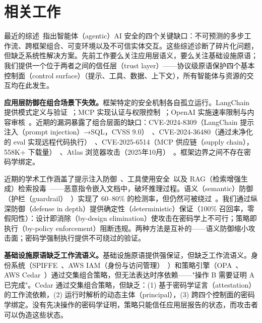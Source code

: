 \section{相关工作}
\label{sec:related-work}

最近的综述~\cite{acm-ai-agents-survey2024,agentic-security-survey2025,gong-prompt-injection2024,liu-protocol-exploits2025}指出智能体（agentic）AI 安全的四个关键缺口：不可预测的多步工作流、跨框架组合、可变环境以及不可信实体交互。这些综述诊断了碎片化问题，但缺乏系统性解决方案。先前工作要么关注应用层语义，要么关注基础设施原语；我们提供一个位于两者之间的信任层（trust layer）——协议级原语保护四个基本控制面（control surface）（提示、工具、数据、上下文），所有智能体与资源的交互均在此发生。

\textbf{应用层防御在组合场景下失效。}框架特定的安全机制各自孤立运行。LangChain 提供模式定义与验证~\cite{langchain2023}；MCP 实现认证与权限控制~\cite{mcp2024}；OpenAI 实施速率限制与内容审核~\cite{openai-assistants2024}。近期的漏洞暴露了组合层面的缺口：CVE-2024-8309（LangChain 提示注入（prompt injection）→SQL，CVSS 9.0）~\cite{cve-2024-8309}、CVE-2024-36480（通过未净化的 eval{} 实现远程代码执行）~\cite{cve-2024-36480}、CVE-2025-6514（MCP 供应链（supply chain），558K+ 下载量）~\cite{github-mcp-cve}、Atlas 浏览器攻击（2025年10月）~\cite{atlas-cve,openai-ciso-atlas}。框架边界之间不存在密码学绑定。

近期的学术工作涵盖了提示注入防御~\cite{perez2022ignore,liu2023prompt,jain2023baseline}、工具使用安全~\cite{ruan2023identifying}以及 RAG（检索增强生成）检索投毒~\cite{zou2024poisonedrag,cheng2024parden}——恶意指令嵌入文档中，破坏推理过程。语义（semantic）防御（护栏（guardrail）~\cite{nemoguardrails2023,rebuff2023,llamaguard2023}）实现了 60--80\% 的检测率，但仍然可被绕过~\cite{wei2023jailbroken,zou2023universal}。我们通过纵深防御（defense in depth）提供确定性（deterministic）保证（100\% 召回率，零假阳性）：设计即消除（by-design elimination）使攻击在密码学上不可行；策略即执行（by-policy enforcement）阻断违规。两种方法是互补的——语义防御缩小攻击面；密码学强制执行提供不可绕过的验证。

\textbf{基础设施原语缺乏工作流语义。}基础设施原语提供强保证，但缺乏工作流语义。身份系统（SPIFFE~\cite{spiffe2023}、AWS IAM（身份与访问管理）~\cite{aws-iam2023}）和策略引擎（OPA~\cite{opa2023}、AWS Cedar~\cite{cedar2023}）通过交集组合策略，但无法表达时序依赖——"操作 B 需要证明 A 已完成"。Cedar 通过交集组合策略，但缺乏：(1) 基于密码学证言（attestation）的工作流依赖，(2) 运行时解析的动态主体（principal），(3) 跨四个控制面的密码学绑定。没有先决操作的密码学证明，策略只能信任应用层报告的状态，而攻击者可以伪造这些状态。

